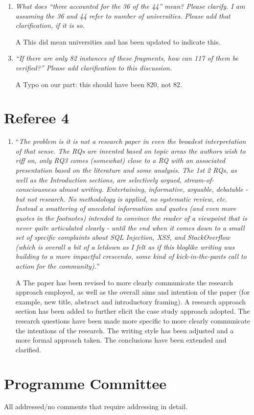 \documentclass[a4paper,11pt]{article}
\begin{document}
\begin{enumerate}
\item {\emph{What does ``three accounted for the 36 of the 44'' mean?
      Please clarify. I am assuming the 36 and 44 refer to number of
      universities. Please add that clarification, if it is so.}}

\item[A] This did mean universities and has been updated to indicate
  this.

\item {\emph{``If there are only 82 instances of these fragments, how
      can 117 of them be verified?'' Please add clarification to this
      discussion.}}

\item[A] Typo on our part: this should have been 820, not 82.
\end{enumerate}

\section*{Referee 4}

\begin{enumerate}
\item ``{\emph{The problem is it is not a research paper in even the
      broadest interpretation of that sense. The RQs are invented
      based on topic areas the authors wish to riff on, only RQ3 comes
      (somewhat) close to a RQ with an associated presentation based
      on the literature and some analysis. The 1st 2 RQs, as well as
      the Introduction sections, are selectively argued,
      stream-of-consciousness almost writing. Entertaining,
      informative, arguable, debatable - but not research. No
      methodology is applied, no systematic review, etc. Instead a
      smattering of anecdotal information and quotes (and even more
      quotes in the footnotes) intended to convince the reader of a
      viewpoint that is never quite articulated clearly - until the
      end when it comes down to a small set of specific complaints
      about SQL Injection, XSS, and StackOverflow (which is overall a
      bit of a letdown as I felt as if this bloglike writing was
      building to a more impactful crescendo, some kind of
      kick-in-the-pants call to action for the community).}}''

\item[A] The paper has been revised to more clearly communicate the
  research approach employed, as well as the overall aims and
  intention of the paper (for example, new title, abstract and
  introductory framing). A research approach section has been
  added to further elicit the case study approach adopted. The
  research questions have been made more specific to more clearly
  communicate the intentions of the research. The writing style has
  been adjusted and a more formal approach taken. The conclusions have
  been extended and clarified.

\end{enumerate}

\section*{Programme Committee}

All addressed/no comments that require addressing in detail.
\end{document}
